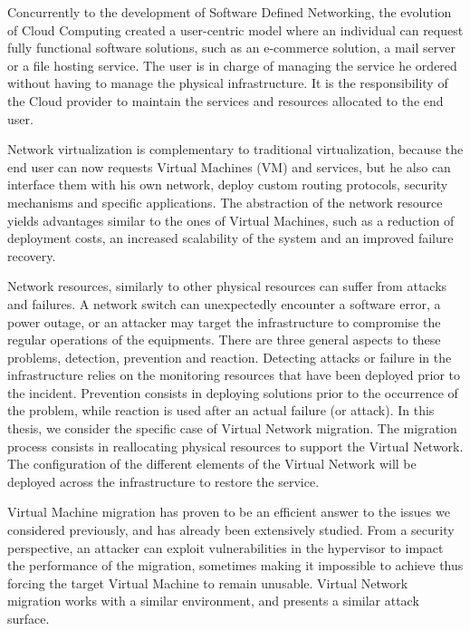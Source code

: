 Concurrently to the development of Software Defined Networking, the evolution of Cloud Computing created a user-centric model where an individual can request fully functional software solutions, such as an e-commerce solution, a mail server or a file hosting service. The user is in charge of managing the service he ordered without having to manage the physical infrastructure.
It is the responsibility of the Cloud provider to maintain the services and resources allocated to the end user.

Network virtualization is complementary to traditional virtualization, because the end user can now requests Virtual Machines (VM) and services, but he also can interface them with his own network, deploy custom routing protocols, security mechanisms and specific applications. The abstraction of the network resource yields advantages similar to the ones of Virtual Machines, such as a reduction of deployment costs, an increased scalability of the system and an improved failure recovery.

Network resources, similarly to other physical resources can suffer from attacks and failures. A network switch can unexpectedly encounter a software error, a power outage, or an attacker may target the infrastructure to compromise the regular operations of the equipments. There are three general aspects to these problems, detection, prevention and reaction. Detecting attacks or failure in the infrastructure relies on the monitoring resources that have been deployed prior to the incident. Prevention consists in deploying solutions prior to the occurrence of the problem, while reaction is used after an actual failure (or attack).
In this thesis, we consider the specific case of Virtual Network migration.
The migration process consists in reallocating physical resources to support the Virtual Network.
The configuration of the different elements of the Virtual Network will be deployed across the infrastructure to restore the service.

Virtual Machine migration has proven to be an efficient answer to the issues we considered previously, and has already been extensively studied. From a security perspective, an attacker can exploit vulnerabilities in the hypervisor to impact the performance of the migration, sometimes making it impossible to achieve thus forcing the target Virtual Machine to remain unusable.
Virtual Network migration works with a similar environment, and presents a similar attack surface.


